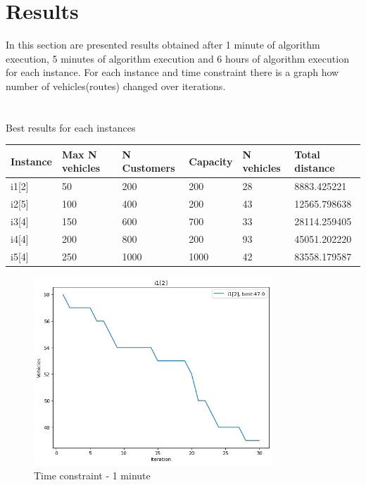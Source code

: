 \documentclass{article}
\begin{document}
\section{Results}
In this section are presented results obtained after 1 minute of algorithm execution, 5 minutes of algorithm execution and 6 hours of algorithm execution for each instance. For each instance and time constraint there is a graph how number of vehicles(routes) changed over iterations.
\\
\\
\\
Best results for each instances
\begin{center}
\begin{tabular}{ | m{4em} | m{8em} | m{7em} | m{4em} || m{7em}| m{7em} | } 
  \hline
  Instance & Max N vehicles & N Customers & Capacity & N vehicles & Total distance \\ 
  \hline
  i1[2] & 50 & 200 & 200 & 28 & 8883.425221 \\ 
  \hline
  i2[5] & 100 & 400 & 200  & 43 & 12565.798638 \\ 
  \hline
  i3[4] & 150 & 600 & 700  & 33 & 28114.259405 \\ 
  \hline
  i4[4] & 200 & 800 & 200  & 93 & 45051.202220 \\ 
  \hline
  i5[4] & 250 & 1000 & 1000  & 42 & 83558.179587 \\ 
  \hline
\end{tabular}
\end{center}

\begin{figure}
\centering
\includegraphics[width=0.8\textwidth]{i1[2]_1_vehicles.png}
\caption{\label{fig:i1[2]_1_vehicles}Time constraint - 1 minute}
\end{figure}
\end{document}
